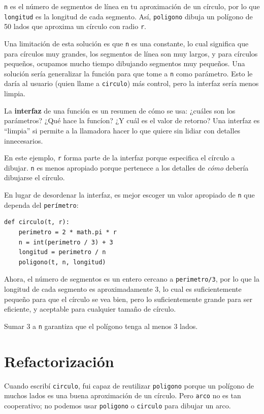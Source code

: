 \documentclass[10pt]{book}
\begin{document}
{\tt n} es el número de segmentos de línea en tu aproximación de un círculo,
por lo que {\tt longitud} es la longitud de cada segmento.  Así, {\tt poligono}
dibuja un polígono de 50 lados que aproxima un círculo con radio {\tt r}.

Una limitación de esta solución es que {\tt n} es una constante, lo cual
significa que para círculos muy grandes, los segmentos de línea son muy largos, y
para círculos pequeños, ocupamos mucho tiempo dibujando segmentos muy pequeños.  Una
solución sería generalizar la función para que tome a {\tt n} como
parámetro.  Esto le daría al usuario (quien llame a {\tt circulo})
más control, pero la interfaz sería menos limpia.

La {\bf interfaz} de una función es un resumen de cómo se usa: ¿cuáles
son los parámetros?  ¿Qué hace la funcíon?  ¿Y cuál es el valor de
retorno?  Una interfaz es ``limpia'' si permite a la llamadora hacer
lo que quiere sin lidiar con detalles innecesarios.

En este ejemplo, {\tt r} forma parte de la interfaz porque
especifica el círculo a dibujar.  {\tt n} es menos apropiado
porque pertenece a los detalles de {\em cómo} debería dibujarse
el círculo.

En lugar de desordenar la interfaz, es mejor
escoger un valor apropiado de {\tt n}
que dependa del {\tt perímetro}:

\begin{verbatim}
def circulo(t, r):
    perimetro = 2 * math.pi * r
    n = int(perimetro / 3) + 3
    longitud = perimetro / n
    poligono(t, n, longitud)
\end{verbatim}
%
Ahora, el número de segmentos es un entero cercano a {\tt perimetro/3},
por lo que la longitud de cada segmento es aproximadamente 3, lo cual es suficientemente
pequeño para que el círculo se vea bien, pero lo suficientemente grande para ser eficiente,
y aceptable para cualquier tamaño de círculo.

Sumar 3 a {\tt n} garantiza que el polígono tenga al menos 3 lados.


\section{Refactorización}
\label{refactoring}

Cuando escribí {\tt circulo}, fui capaz de reutilizar {\tt poligono}
porque un polígono de muchos lados es una buena aproximación de un círculo.
Pero {\tt arco} no es tan cooperativo; no podemos usar {\tt poligono}
o {\tt circulo} para dibujar un arco.
\end{document}
